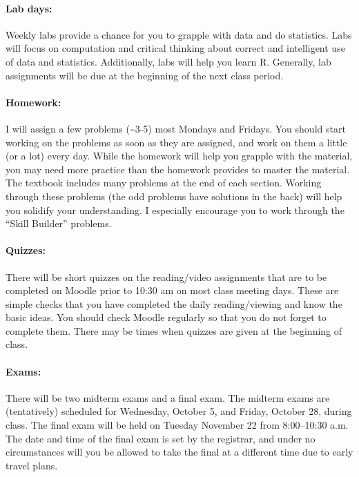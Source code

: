 \documentclass[11pt,]{article}
\begin{document}
\paragraph{Lab days:}\label{lab-days}

Weekly labs provide a chance for you to grapple with data and do
statistics. Labs will focus on computation and critical thinking about
correct and intelligent use of data and statistics. Additionally, labs
will help you learn R. Generally, lab assignments will be due at the
beginning of the next class period.

\paragraph{Homework:}\label{homework}

I will assign a few problems (\textasciitilde{}3-5) most Mondays and
Fridays. You should start working on the problems as soon as they are
assigned, and work on them a little (or a lot) every day. While the
homework will help you grapple with the material, you may need more
practice than the homework provides to master the material. The textbook
includes many problems at the end of each section. Working through these
problems (the odd problems have solutions in the back) will help you
solidify your understanding. I especially encourage you to work through
the ``Skill Builder'' problems.

\paragraph{Quizzes:}\label{quizzes}

There will be short quizzes on the reading/video assignments that are to
be completed on Moodle prior to 10:30 am on most class meeting days.
These are simple checks that you have completed the daily
reading/viewing and know the basic ideas. You should check Moodle
regularly so that you do not forget to complete them. There may be times
when quizzes are given at the beginning of class.

\paragraph{Exams:}\label{exams}

There will be two midterm exams and a final exam. The midterm exams are
(tentatively) scheduled for Wednesday, October 5, and Friday, October
28, during class. The final exam will be held on Tuesday November 22
from 8:00--10:30 a.m. The date and time of the final exam is set by the
registrar, and under no circumstances will you be allowed to take the
final at a different time due to early travel plans.
\end{document}
